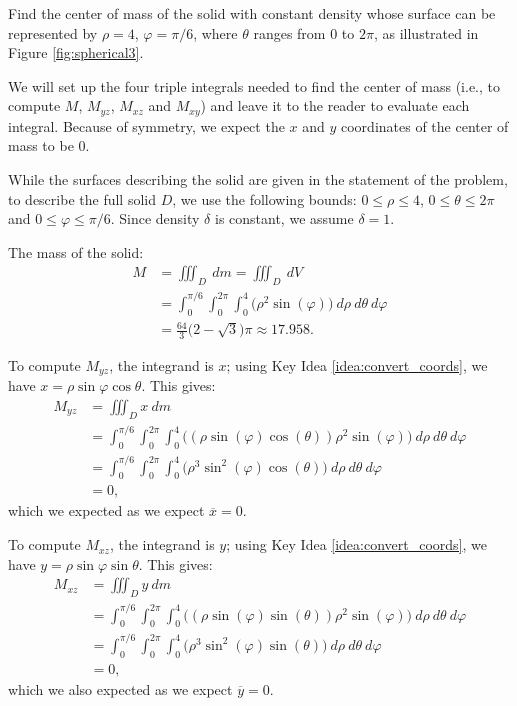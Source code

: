 {Find the center of mass of the solid with constant density whose surface can be represented by $\rho=4$, $\varphi = \pi/6$, where $\theta$ ranges from $0$ to $2\pi$, as illustrated in Figure \ref{fig:spherical3}.
}
{We will set up the four triple integrals needed to find the center of mass (i.e., to compute $M$, $M_{yz}$, $M_{xz}$ and $M_{xy}$) and leave it to the reader to evaluate each integral. Because of symmetry, we expect the $x$ and $y$ coordinates of the center of mass to be 0.

While the surfaces describing the solid are given in the statement of the problem, to describe the full solid $D$, we use the following bounds: $0 \leq \rho \leq 4$, $0 \leq \theta \leq 2\pi$ and $0 \leq \varphi \leq \pi/6$. Since density $\delta$ is constant, we assume $\delta =1$.

The mass of the solid:
\begin{align*}
M &= \iiint_D\ dm = \iiint_D\ dV\\
	&= \int_0^{\pi/6}\int_0^{2\pi}\int_0^4\big(\rho^2\sin(\varphi)\big)\ d\rho\ d\theta\ d\varphi\\
	&= \frac{64}3\big(2-\sqrt{3}\big)\pi \approx 17.958.
\end{align*}

To compute $M_{yz}$, the integrand is $x$; using Key Idea \ref{idea:convert_coords}, we have $x = \rho\sin\varphi\cos\theta$. This gives:
\drawexampleline
\begin{align*}
M_{yz} &= \iiint_D x\ dm \\
	&= \int_0^{\pi/6}\int_0^{2\pi}\int_0^4 \big((\rho\sin(\varphi)\cos(\theta))\rho^2\sin(\varphi)\big) \ d\rho\ d\theta\ d\varphi\\
	&= \int_0^{\pi/6}\int_0^{2\pi}\int_0^4 \big(\rho^3\sin^2(\varphi)\cos(\theta)\big) \ d\rho\ d\theta\ d\varphi\\
	&=0,
\end{align*}
which we expected as we expect $\overline{x} = 0$.

To compute $M_{xz}$, the integrand is $y$; using Key Idea \ref{idea:convert_coords}, we have $y = \rho\sin\varphi\sin\theta$. This gives:
\begin{align*}
M_{xz} &= \iiint_D y\ dm \\
	&= \int_0^{\pi/6}\int_0^{2\pi}\int_0^4 \big((\rho\sin(\varphi)\sin(\theta))\rho^2\sin(\varphi)\big) \ d\rho\ d\theta\ d\varphi\\
	&= \int_0^{\pi/6}\int_0^{2\pi}\int_0^4 \big(\rho^3\sin^2(\varphi)\sin(\theta)\big) \ d\rho\ d\theta\ d\varphi\\
	&=0,
\end{align*}
which we also expected as we expect $\overline{y} = 0$.

}
